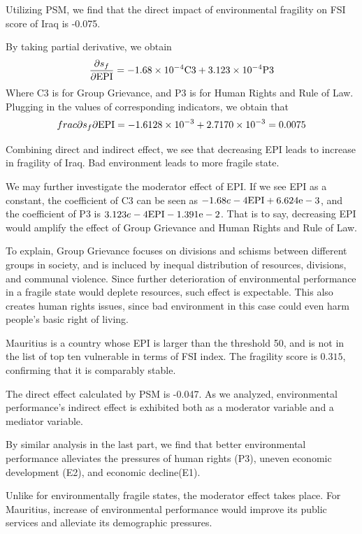 Utilizing PSM, we find that the direct impact of environmental fragility on FSI score of Iraq is -0.075.

By taking partial derivative, we obtain
$$
\frac{\partial{s_f}}{\partial{\rm{EPI}}} = -1.68 \times 10^{-4} \rm{C3} + 3.123 \times 10^{-4}\rm{P3}
$$
Where C3 is for Group Grievance, and P3 is for Human Rights and Rule of Law. 
Plugging in the values of corresponding indicators, we obtain that  
$$
\\frac{\partial{s_f}}{\partial{\rm{EPI}}} = -1.6128\times 10^{-3} +2.7170 \times 10^{-3} = 0.0075 $$

Combining direct and indirect effect, we see that decreasing EPI leads to increase in fragility of Iraq. Bad environment leads to more fragile state.

We may further investigate the moderator effect of EPI. If we see EPI as a constant, the coefficient of C3 can be seen as $-1.68e-4\rm{EPI}+6.624e-3$, and the coefficient of P3 is $3.123e-4\rm{EPI} - 1.391e-2 $. That is to say, decreasing EPI would amplify the effect of Group Grievance and Human Rights and Rule of Law. 

To explain, Group Grievance focuses on divisions and schisms between different groups in society, and is incluced by inequal distribution of resources, divisions, and communal violence.
Since further deterioration of environmental performance in a fragile state would deplete resources, such effect is expectable. This also creates human rights issues, since bad environment in this case could even harm people's basic right of living. 

Mauritius is a country whose EPI is larger than the threshold 50, and is not in the list of top ten vulnerable in terms of FSI index. The fragility score is $0.315$, confirming that it is comparably stable.

The direct effect calculated by PSM is -0.047. As we analyzed, environmental performance's indirect effect is exhibited both as a moderator variable and a mediator variable. 

By similar analysis in the last part, we find that better environmental performance alleviates the pressures of human rights (P3), uneven economic development (E2), and economic decline(E1). 

Unlike for environmentally fragile states, the moderator effect takes place. For Mauritius, increase of environmental performance would improve its public services and alleviate its demographic pressures.


